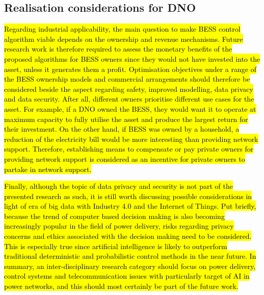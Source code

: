 \subsection{Realisation considerations for DNO}

\hl{Regarding industrial applicability, the main question to make BESS control algorithm viable depends on the ownership and revenue mechanisms.
Future research work is therefore required to assess the monetary benefits of the proposed algorithms for BESS owners since they would not have invested into the asset, unless it generates them a profit.
Optimisation objectives under a range of the BESS ownership models and commercial arrangements should therefore be considered beside the aspect regarding safety, improved modelling, data privacy and data security.
After all, different owners prioritise different use cases for the asset.
For example, if a DNO owned the BESS, they would want it to operate at maximum capacity to fully utilise the asset and produce the largest return for their investment.
On the other hand, if BESS was owned by a household, a reduction of the electricity bill would be more interesting than providing network support.
Therefore, establishing means to compensate or pay private owners for providing network support is considered as an incentive for private owners to partake in network support.}

\hl{Finally, although the topic of data privacy and security is not part of the presented research as such, it is still worth discussing possible considerations in light of era of big data with Industry 4.0 and the Internet of Things.
Put briefly, because the trend of computer based decision making is also becoming increasingly popular in the field of power delivery, risks regarding privacy concerns and ethics associated with the decision making need to be considered.
This is especially true since artificial intelligence is likely to outperform traditional deterministic and probabilistic control methods in the near future.
In summary, an inter-disciplinary research category should focus on power delivery, control systems and telecommunication issues with particularly target of AI in power networks, and this should most certainly be part of the future work.}

